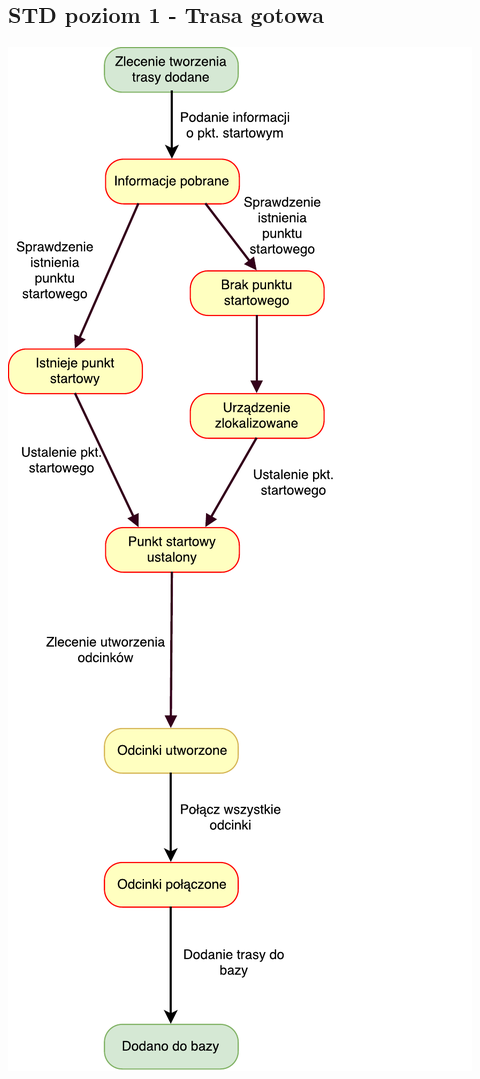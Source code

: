 \documentclass[11pt]{article}
\begin{document}
	\subsection{STD poziom 1 - Trasa gotowa}
	\begin{center}
		\includegraphics[scale=0.9]{STD2.pdf}
	\end{center}
	\newpage
\end{document}
